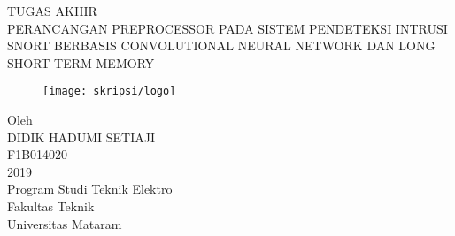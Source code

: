 \documentclass[./skripsi.tex]{subfiles}
\begin{document}
 
\begin{titlepage}
	\centering 
	\scshape 
	\vspace*{\baselineskip} 
	\vspace{0.75\baselineskip} 
	{TUGAS AKHIR\\
	\vspace{0.\baselineskip}
	PERANCANGAN PREPROCESSOR PADA SISTEM PENDETEKSI INTRUSI SNORT BERBASIS CONVOLUTIONAL NEURAL NETWORK DAN LONG SHORT TERM MEMORY\\}
	\vspace{0.75\baselineskip}
	\vspace{2\baselineskip}
	\begin{figure}[h!]
	\begin{center}
	    \texttt{[image: skripsi/logo]}
	\end{center}
	\end{figure}
	\vspace*{3\baselineskip} 
	Oleh \\
	\vspace{0.5\baselineskip} 
	{\scshape\Large DIDIK HADUMI SETIAJI \\ F1B014020 \\} 
	\vspace{0.5\baselineskip} 
	\vfill
	\vspace{0.3\baselineskip} 
	2019 \\
	{\large Program Studi Teknik Elektro \\ Fakultas Teknik \\ Universitas Mataram} 
\end{titlepage}
\end{document}
